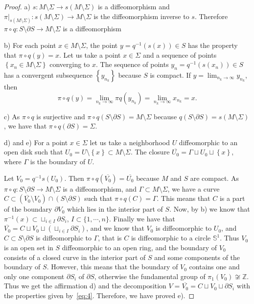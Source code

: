 \documentclass[12pt,letterpaper]{amsart}
\theoremstyle{definition}
\theoremstyle{plain}
\theoremstyle{remark}
\begin{document}
\begin{proof}
a) $s : M \setminus \Sigma \to s(M \setminus \Sigma)$ is a diffeomorphism and $\left. \pi \right|_{s(M \setminus \Sigma)} : s(M \setminus \Sigma) \to M \setminus \Sigma$ is the diffeomorphism inverse to $s$.
Therefore $\pi \circ q : S \setminus \partial S \to M \setminus \Sigma$ is a diffeomorphism

b) For each point $x \in M \setminus \Sigma$, the point $y = q^{-1}(s(x)) \in S$ has the property that $\pi \circ q(y) = x$.
Let us take a point $x \in \Sigma$ and a sequence of points $\left\{ x_n \in M \setminus \Sigma \right\}$ converging to $x$.
The sequence of points $y_n = q^{-1}(s(x_n)) \in S$ has a convergent subsequence $\left\{ y_{n_k} \right\}$ because $S$ is compact.
If $y = \lim_{n_k \to \infty} y_{n_k}$, then
\begin{equation}
\pi \circ q(y) = \lim_{n_k \to \infty} \pi q(y_{n_k}) = \lim_{n_k \to \infty} x_{n_k} = x.
\label{eq:5}
\end{equation}

c) As $\pi \circ q$ is surjective and $\pi \circ q(S \setminus \partial S) = M \setminus \Sigma$ because $q(S \setminus \partial S) = s(M \setminus \Sigma)$, we have that $\pi \circ q(\partial S) = \Sigma$.

d) and e)
For a point $x \in \Sigma$ let us take a neighborhood $U$ diffeomorphic to an open disk such that $U_0 = U \setminus \left\{ x \right\} \subset M \setminus \Sigma$.
The closure $\overline{U_0} = \Gamma \sqcup U_0 \sqcup \left\{ x \right\}$, where $\Gamma$ is the boundary of $U$.

Let $V_0 = q^{-1} s(U_0)$. Then $\pi \circ q(\overline{V_0}) = \overline{U_0}$ because $M$ and $S$ are compact.
As $\pi \circ q : S \setminus \partial S \to M \setminus \Sigma$ is a diffeomorphism, and $\Gamma \subset M \setminus \Sigma$, we have a curve $C \subset (\overline{V_0} \setminus V_0) \cap (S \setminus \partial S)$ such that $\pi \circ q(C) = \Gamma$.
This means that $C$ is a part of the boundary $\partial V_0$ which lies in the interior part of $S$.
Now, by b) we know that $\pi^{-1}(x) \subset \sqcup_{i \in I} \partial S_i$, $I \subset \{1, \cdots, n\}$.
Finally we have that $\overline{V_0} = C \sqcup V_0 \sqcup \left( \sqcup_{i \in I} \partial S_i \right)$, and we know that $V_0$ is diffeomorphic to $U_0$, and $C \subset S \setminus \partial S$ is diffeomorphic to $\Gamma$, that is $C$ is diffeomorphic to a circle $\mathbb{S}^1$.
Thus $V_0$ is an open set in $S$ diffeomorphic to an open ring, and the boundary of $V_0$ consists of a closed curve in the interior part of $S$ and some components of the boundary of $S$.
However, this means that the boundary of $V_0$ contains one and only one component $\partial S_i$ of $\partial S$, otherwise the fundamental group of $\pi_1(V_0) \not\cong \mathbb{Z}$.
Thus we get the affirmation d) and the decomposition $V = \overline{V_0} = C \sqcup V_0 \sqcup \partial S_i$ with the properties given by~\eqref{eq:4}.
Therefore, we have proved e).
\end{proof}
\end{document}
